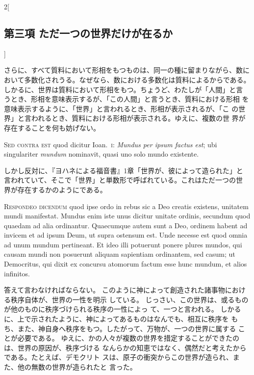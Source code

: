 \documentclass[paper=a4paper,fontsize=10pt,jafontsize=9pt,titlepage]{jlreq}
\begin{document}
\begin{paracol}{2}[\subsection{第三項 ただ一つの世界だけが在るか}]
\switchcolumn


さらに、すべて質料において形相をもつものは、同一の種に留まりながら、数に
 おいて多数化されうる。なぜなら、数における多数化は質料によるからである。
 しかるに、世界は質料において形相をもつ。ちょうど、わたしが「人間」と言
 うとき、形相を意味表示するが、「この人間」と言うとき、質料における形相
 を意味表示するように、「世界」と言われるとき、形相が表示されるが、「こ
 の世界」と言われるとき、質料における形相が表示される。ゆえに、複数の世
 界が存在することを何も妨げない。


\switchcolumn*[\subsection{s.c.}]


{\scshape Sed contra est} quod dicitur Ioan.~{\scshape i}: {\itshape
Mundus per ipsum factus est}; ubi singulariter {\itshape mundum}
nominavit, quasi uno solo mundo existente.


\switchcolumn


しかし反対に、『ヨハネによる福音書』1章「世界が、彼によって造られた」と
 言われていて、そこで「世界」と単数形で呼ばれている。これはただ一つの世
 界が存在するかのようにである。




{\scshape Respondeo dicendum} quod ipse ordo in rebus sic
a Deo creatis existens, unitatem mundi manifestat. Mundus enim iste unus
dicitur unitate ordinis, secundum quod quaedam ad alia
ordinantur. Quaecumque autem sunt a Deo, ordinem habent ad invicem et ad
ipsum Deum, ut supra ostensum est. Unde necesse est quod omnia ad unum
mundum pertineant. Et ideo illi potuerunt ponere plures mundos, qui
causam mundi non posuerunt aliquam sapientiam ordinantem, sed casum; ut
Democritus, qui dixit ex concursu atomorum factum esse hunc mundum, et
alios infinitos.


\switchcolumn


答えて言わなければならない。
このように神によって創造された諸事物における秩序自体が、世界の一性を明示
 している。
じっさい、この世界は、或るものが他のものに秩序づけられる秩序の一性によっ
 て、一つと言われる。
しかるに、上で示されたように、神によってあるものはなんでも、相互に秩序を
 もち、また、神自身へ秩序をもつ。したがって、万物が、一つの世界に属する
 ことが必要である。
ゆえに、かの人々が複数の世界を措定することができたのは、世界の原因が、秩序づける
 なんらかの知恵ではなく、偶然だと考えたからである。たとえば、デモクリト
 スは、原子の衝突からこの世界が造られ、また、他の無数の世界が造られたと
 言った。



\end{paracol}
\end{document}
